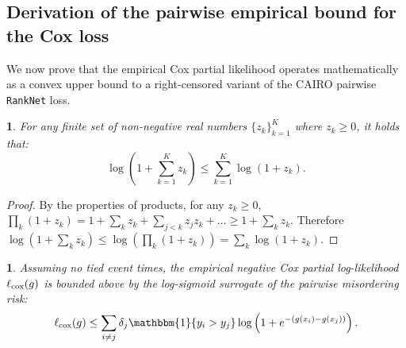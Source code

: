 \documentclass[11pt]{article}
\theoremstyle{plain}
\theoremstyle{plain}
\theoremstyle{plain}
\theoremstyle{plain}
\newtheorem{theorem}{\protect\theoremname}
\theoremstyle{plain}
\theoremstyle{plain}
\theoremstyle{plain}
\newtheorem{lemma}{\protect\lemmaname}
\providecommand{\lemmaname}{Lemma}
\providecommand{\theoremname}{Theorem}
\begin{document}
\subsection{Derivation of the pairwise empirical bound for the Cox loss}

We now prove that the empirical Cox partial likelihood operates mathematically as a convex upper bound to a right-censored variant of the \textsc{CAIRO} pairwise \texttt{RankNet} loss.

\begin{lemma} 
\label{lem:log_subadd}
For any finite set of non-negative real numbers $\{z_k\}_{k=1}^K$ where $z_k \ge 0$, it holds that:
\begin{equation}
    \log\left( 1 + \sum_{k=1}^K z_k \right) \le \sum_{k=1}^K \log(1 + z_k).
\end{equation}
\end{lemma}
\begin{proof}
By the properties of products, for any $z_k \ge 0$, $\prod_k (1 + z_k) = 1 + \sum_k z_k + \sum_{j < k} z_j z_k + \dots \ge 1 + \sum_k z_k$. Therefore $\log(1 + \sum_k z_k) \le \log(\prod_k (1+z_k)) = \sum_k \log(1+z_k)$.
\end{proof}

\begin{theorem}
Assuming no tied event times, the empirical negative Cox partial log-likelihood $\ell_{\textup{cox}}(g)$ is bounded above by the log-sigmoid surrogate of the pairwise misordering risk:
\begin{equation}
    \ell_{\textup{cox}}(g)
\le
\sum_{i \neq j}\delta_j \mathbbm{1}\{y_i > y_j\}
\log \left(
1 + e^{-(g(x_i)-g(x_j))}
\right).
\end{equation}
\end{theorem}
\end{document}
